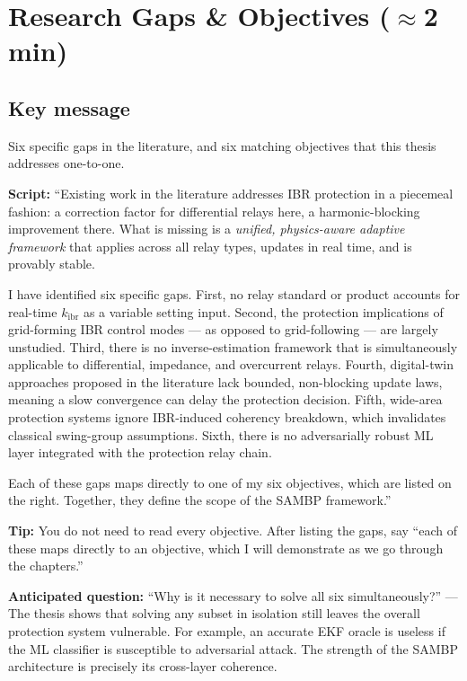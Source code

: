 \documentclass[11pt,a4paper]{article}
\newcommand{\script}[1]{\begin{scriptbox}\textbf{Script:} #1\end{scriptbox}}
\newcommand{\tip}[1]{\begin{tipbox}\textbf{Tip:} #1\end{tipbox}}
\newcommand{\anticipate}[1]{\begin{warnbox}\textbf{Anticipated question:} #1\end{warnbox}}
\newcommand{\kibr}{k_{\mathrm{ibr}}}
\begin{document}
\section{Research Gaps \& Objectives \hfill\normalfont\small($\approx$2 min)}
\label{slide:gaps}

\subsection*{Key message}
Six specific gaps in the literature, and six matching objectives that this thesis
addresses one-to-one.

\script{%
``Existing work in the literature addresses IBR protection in a piecemeal fashion:
a correction factor for differential relays here, a harmonic-blocking improvement there.
What is missing is a \textit{unified, physics-aware adaptive framework} that applies
across all relay types, updates in real time, and is provably stable.

I have identified six specific gaps. First, no relay standard or product accounts for
real-time $\kibr$ as a variable setting input. Second, the protection implications of
grid-forming IBR control modes --- as opposed to grid-following --- are largely unstudied.
Third, there is no inverse-estimation framework that is simultaneously applicable to
differential, impedance, and overcurrent relays. Fourth, digital-twin approaches proposed
in the literature lack bounded, non-blocking update laws, meaning a slow convergence can
delay the protection decision. Fifth, wide-area protection systems ignore IBR-induced
coherency breakdown, which invalidates classical swing-group assumptions. Sixth, there is
no adversarially robust ML layer integrated with the protection relay chain.

Each of these gaps maps directly to one of my six objectives, which are listed on the
right. Together, they define the scope of the SAMBP framework.''%
}

\tip{You do not need to read every objective. After listing the gaps, say ``each of these
maps directly to an objective, which I will demonstrate as we go through the chapters.''}

\anticipate{``Why is it necessary to solve all six simultaneously?'' ---
The thesis shows that solving any subset in isolation still leaves the overall protection
system vulnerable. For example, an accurate EKF oracle is useless if the ML classifier is
susceptible to adversarial attack. The strength of the SAMBP architecture is precisely its
cross-layer coherence.}
\end{document}
